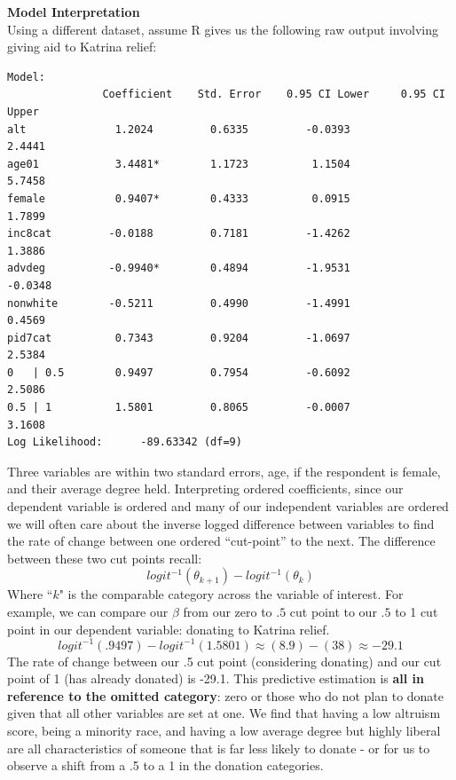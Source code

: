 \documentclass[12pt]{article}\usepackage[]{graphicx}\usepackage[]{color}
\begin{document}
\begin{flushleft}
\noindent \textbf{Model Interpretation} \\
Using a different dataset, assume R gives us the following raw output involving giving aid to Katrina relief:
\begin{verbatim}
Model:
               Coefficient    Std. Error    0.95 CI Lower     0.95 CI Upper
alt              1.2024         0.6335         -0.0393            2.4441
age01            3.4481*        1.1723          1.1504            5.7458
female           0.9407*        0.4333          0.0915            1.7899
inc8cat         -0.0188         0.7181         -1.4262            1.3886
advdeg          -0.9940*        0.4894         -1.9531           -0.0348
nonwhite        -0.5211         0.4990         -1.4991            0.4569
pid7cat          0.7343         0.9204         -1.0697            2.5384
0   | 0.5        0.9497         0.7954         -0.6092            2.5086
0.5 | 1          1.5801         0.8065         -0.0007            3.1608
Log Likelihood:      -89.63342 (df=9)
\end{verbatim}

Three variables are within two standard errors, age, if the respondent is female, and their average degree held. Interpreting ordered coefficients, since our dependent variable is ordered and many of our independent variables are ordered we will often care about the inverse logged difference between variables to find the rate of change between one ordered ``cut-point'' to the next. The difference between these two cut points recall:\\
\begin{equation}
logit^{-1} (\theta_{k+1}) - logit^{-1}(\theta_k)
\end{equation}
Where ``$k$" is the comparable category across the variable of interest. For example, we can compare our $\beta$ from our zero to $.5$ cut point to our $.5$ to 1 cut point in our dependent variable: donating to Katrina relief.
\begin{equation}
logit^{-1} (.9497) - logit^{-1}(1.5801) \approx (8.9) - (38) \approx   -29.1
\end{equation}
The rate of change between our .5 cut point (considering donating) and our cut point of 1 (has already donated) is -29.1. This predictive estimation is \textbf{all in reference to the omitted category}: zero or those who do not plan to donate given that all other variables are set at one. We find that having a low altruism score, being a minority race, and having a low average degree but highly liberal are all characteristics of someone that is far less likely to donate - or for us to observe a shift from a .5 to a 1 in the donation categories.


\end{flushleft}
\end{document}
